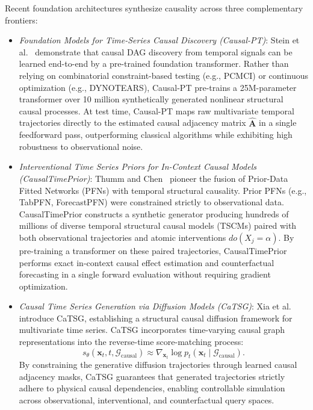 Recent foundation architectures synthesize causality across three complementary frontiers:
\begin{itemize}[leftmargin=*]
    \item \emph{Foundation Models for Time-Series Causal Discovery (Causal-PT)}: Stein et al.~\cite{stein2024embracing} demonstrate that causal DAG discovery from temporal signals can be learned end-to-end by a pre-trained foundation transformer. Rather than relying on combinatorial constraint-based testing (e.g., PCMCI) or continuous optimization (e.g., DYNOTEARS), Causal-PT pre-trains a 25M-parameter transformer over 10 million synthetically generated nonlinear structural causal processes. At test time, Causal-PT maps raw multivariate temporal trajectories directly to the estimated causal adjacency matrix $\hat{\mathbf{A}}$ in a single feedforward pass, outperforming classical algorithms while exhibiting high robustness to observational noise.
    \item \emph{Interventional Time Series Priors for In-Context Causal Models (CausalTimePrior)}: Thumm and Chen~\cite{thumm2026interventional} pioneer the fusion of Prior-Data Fitted Networks (PFNs) with temporal structural causality. Prior PFNs (e.g., TabPFN, ForecastPFN) were constrained strictly to observational data. CausalTimePrior constructs a synthetic generator producing hundreds of millions of diverse temporal structural causal models (TSCMs) paired with both observational trajectories and atomic interventions $do(X_j = \alpha)$. By pre-training a transformer on these paired trajectories, CausalTimePrior performs exact in-context causal effect estimation and counterfactual forecasting in a single forward evaluation without requiring gradient optimization.
    \item \emph{Causal Time Series Generation via Diffusion Models (CaTSG)}: Xia et al.~\cite{xia2025causal} introduce CaTSG, establishing a structural causal diffusion framework for multivariate time series. CaTSG incorporates time-varying causal graph representations into the reverse-time score-matching process:
    \begin{equation}
        s_\theta(\mathbf{x}_t, t, \mathcal{G}_{\text{causal}}) \approx \nabla_{\mathbf{x}_t} \log p_t(\mathbf{x}_t \mid \mathcal{G}_{\text{causal}}).
    \end{equation}
    By constraining the generative diffusion trajectories through learned causal adjacency masks, CaTSG guarantees that generated trajectories strictly adhere to physical causal dependencies, enabling controllable simulation across observational, interventional, and counterfactual query spaces.
\end{itemize}

